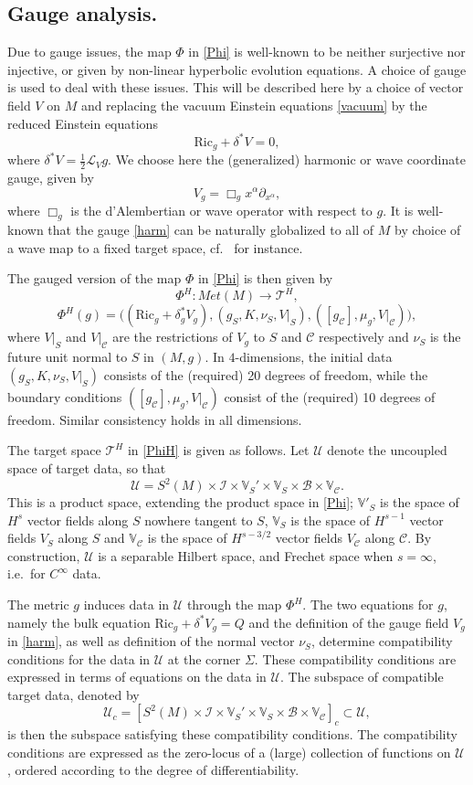 \documentclass[10pt]{amsart}
\renewcommand{\a}{\alpha}
\renewcommand{\d}{\delta}
\newcommand{\Si}{\Sigma}
\newcommand{\cC}{{\mathcal C}}
\newcommand{\cT}{{\mathcal T}}
\newcommand{\cB}{{\mathcal B}}
\newcommand{\cL}{{\mathcal L}}
\newcommand{\cU}{{\mathcal U}}
\newcommand{\cI}{\mathcal I}
\newcommand{\bV}{\mathbb V}
\newcommand{\Ric}{\mathrm{Ric}}
\newcommand{\be}{\begin{equation}}
\newcommand{\ee}{\end{equation}}
\newcommand{\p}{\partial}
\renewcommand{\to}{\rightarrow}
\newcommand{\<}{\langle}
\renewcommand{\>}{\rangle}
\theoremstyle{plain}
\theoremstyle{remark}
\theoremstyle{definition}
\numberwithin{equation}{section}
\begin{document}
\subsection{Gauge analysis.}

  Due to gauge issues, the map $\Phi$ in \eqref{Phi} is well-known to be neither surjective nor injective, or given by non-linear hyperbolic evolution equations. 
A choice of gauge is used to deal with these issues. This will be described here by a choice of vector field $V$ on $M$ and replacing the vacuum Einstein equations 
\eqref{vacuum} by the reduced Einstein equations 
\be \label{Q}
 \Ric_g + \d^*V = 0,
\ee
where $\d^*V = \frac{1}{2}\cL_V g$. We choose here the (generalized) harmonic or wave coordinate gauge, given by 
\be \label{harm}
V_g = \Box_g x^{\a}\p_{x^{\a}},
\ee
where $\Box_g$ is the d'Alembertian or wave operator with respect to $g$. It is well-known that the gauge \eqref{harm} can be naturally globalized 
to all of $M$ by choice of a wave map to a fixed target space, cf.~\cite{I} for instance.  

  The gauged version of the map $\Phi$ in \eqref{Phi} is then given by 
\be \label{PhiH}
 \Phi^H: Met(M) \to \cT^H,
 \ee
$$\Phi^H(g) = \big((\Ric_g + \d_g^* V_g), (g_S, K, \nu_S, V|_S), ([g_{\cC}], \mu_g, V|_{\cC}) \big),$$ 
where $V|_S$ and $V|_{\cC}$ are the restrictions of $V_g$ to $S$ and $\cC$ respectively and $\nu_S$ is the future unit normal to $S$ in $(M, g)$. In 
$4$-dimensions, the initial data $(g_S, K, \nu_S, V|_S)$ consists of the (required) 20 degrees of freedom, while the boundary conditions 
$([g_{\cC}], \mu_g, V|_{\cC})$ consist of the (required) 10 degrees of freedom. Similar consistency holds in all dimensions. 

 The target space $\cT^H$ in \eqref{PhiH} is given as follows. Let $\cU$ denote the uncoupled space of target data, so that 
 $$\cU =  S^2(M) \times \cI \times \bV_S' \times \bV_S \times \cB \times \bV_{\cC}.$$
This is a product space, extending the product space in \eqref{Phi};  $\bV'_S$ is the space of $H^s$ vector fields along $S$ nowhere 
tangent to $S$, $\bV_S$ is the space of $H^{s-1}$ vector fields $V_S$ along $S$ and $\bV_{\cC}$ is the space of $H^{s-3/2}$ vector 
fields $V_{\cC}$ along $\cC$. By construction, $\cU$ is a separable Hilbert space, and Frechet space when $s = \infty$, i.e.~for $C^{\infty}$ 
data.  

  The metric $g$ induces data in $\cU$ through the map $\Phi^H$. The two equations for $g$, namely the bulk equation $\Ric_g + \d^*V_g = Q$ 
and the definition of the gauge field $V_g$ in \eqref{harm}, as well as definition of the normal vector $\nu_S$, determine compatibility 
conditions for the data in $\cU$ at the corner $\Si$. These compatibility conditions are expressed in terms of equations on the data in $\cU$. 
The subspace of compatible target data, denoted by   
$$\cU_c = [S^2(M) \times \cI \times \bV_S' \times \bV_S \times \cB \times \bV_{\cC}]_c \subset \cU, $$
is then the subspace satisfying these compatibility conditions. The compatibility conditions are expressed as the zero-locus of a (large) collection of 
functions on $\cU$, ordered according to the degree of differentiability.  
\end{document}
